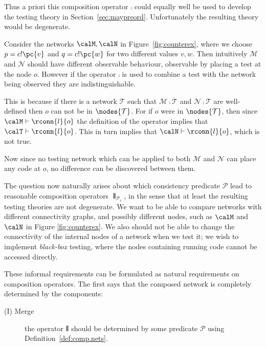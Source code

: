 \documentclass{LMCS}
\begin{document}
Thus a priori this composition operator $\comp$ could equally well 
be used to develop the testing theory in Section~\ref{sec:maypreord}. 
Unfortunately the resulting theory would be degenerate.
\begin{exa}
  Consider the networks $\calM, \calN$ in Figure~\ref{fig:counterex}, 
  where we choose $p = c!\pc{v}$ and $q = c!\pc{w}$ for two different 
  values $v,w$.
Then intuitively ${\mathcal M}$ and ${\mathcal N}$ 
  should have different observable behaviour, observable by placing 
  a test at the node $o$. However if the operator $\comp$ is used 
  to combine a test with the network being observed they are 
  indistinguishable. 

   This is because if there is a  network $\mathcal T$  such that
  ${\mathcal M} \comp {\mathcal T}$ and ${\mathcal N} \comp
  {\mathcal T}$ are well-defined then $o$ can not be in
  $\nodes{\mathcal T}$.  For if $o$ were in $\nodes{\mathcal T}$, then
  since $\calM \vdash \rconn{l}{o}$ the definition of the operator
  implies that $\calT \vdash \rconn{l}{o}$.  This in turn implies
  that $\calN \vdash \rconn{l}{o}$, which is not true.

  Now since no testing network which can be applied to both ${\mathcal
    M}$ and ${\mathcal N}$ can place any code at $o$, no difference
  can be discovered between them.
 \end{exa}

The question now naturally arises about which consistency predicate $\mathscr{P}$ 
lead to reasonable composition operators  $\interleave_{\mathscr{P}_s}$, in the sense 
that at least the resulting testing theories are not degenerate. 
We want to be able to compare networks with different connectivity graphs, and
possibly different nodes, such as $\calM$ and $\calN$ in Figure \ref{fig:counterex}. 
We also should not be able to change the
connectivity of the internal nodes of a network when we test it; we wish to implement
\emph{black-box} testing, where the nodes containing running code cannot 
be accessed directly.  

These informal requirements can be formulated as natural requirements on composition
operators. 
The
first says that the composed network is completely determined by the
components:
\begin{description}
\item[(I) Merge] the operator $\interleave$ should be determined by
  some predicate $\mathscr{P}$ using
  Definition~\ref{def:comp.nets}.
\end{description}
\end{document}

